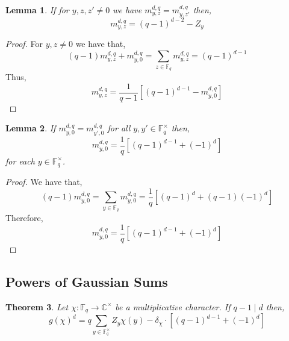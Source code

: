 \documentclass{article}
\newcommand{\C}{\mathbb{C}}
\newcommand{\finfield}[1]{\mathbb{F}_{#1}}
\newcommand{\finunits}[1]{\mathbb{F}_{#1}^\times}
\newcommand{\divides}{\mid}
\newtheorem{theorem}{Theorem}[section]
\newtheorem{lemma}[theorem]{Lemma}
\theoremstyle{definition}
\theoremstyle{definition}
\theoremstyle{remark}
\begin{document}
\begin{lemma} \label{lem:determine_all_nonzero}
If for $y, z, z' \neq 0$ we have $m^{d,q}_{y,z} = m^{d,q}_{y,z'}$ then,
\[ m^{d,q}_{y, z} = (q-1)^{d-2} - Z_{y} \]
\end{lemma}

\begin{proof}
For $y,z \neq 0$ we have that,
\[  (q-1) m^{d,q}_{y,z} + m^{d,q}_{y,0}  = \sum_{z \in \finfield{q}} m^{d,q}_{y,z} = (q-1)^{d-1}  \] 
Thus,
\[ m^{d,q}_{y, z} = \frac{1}{q-1} \left[ (q-1)^{d-1} -  m^{d,q}_{y, 0} \right] \]
\end{proof}

\begin{lemma} \label{lem:equal_Z}
If $m^{d,q}_{y, 0} = m^{d,q}_{y', 0}$ for all $y, y' \in \finunits{q}$ then,
\[ m^{d,q}_{y, 0} = \frac{1}{q} \left[ (q-1)^{d-1} + (-1)^d \right] \]
for each $y \in \finunits{q}$. 
\end{lemma}

\begin{proof}
We have that,
\[ (q-1) m^{d,q}_{y, 0} = \sum_{y \in \finfield{q}} m^{d,q}_{y,0} = \frac{1}{q} \left[ (q-1)^d + (q-1)(-1)^d \right] \]
Therefore, 
\[ m^{d,q}_{y, 0} = \frac{1}{q} \left[ (q-1)^{d-1} + (-1)^d \right] \]
\end{proof}



\subsection{Powers of Gaussian Sums}


\begin{theorem} \label{thm:gauss_sums_via_m_vals}
Let $\chi : \finfield{q} \to \C^\times$ be a multiplicative character. If $q - 1 \divides d$ then,
\[ g(\chi)^d = q \sum_{y \in \finunits{q}} Z_y \chi(y) - \delta_{\chi} \cdot \left[ (q-1)^{d-1} + (-1)^d \right] \] 
\end{theorem}
\end{document}
